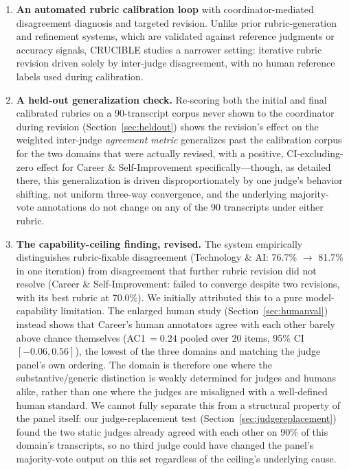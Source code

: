 \documentclass[11pt]{article}
\begin{document}
\begin{enumerate}[leftmargin=*, label=\arabic*.]
\item \textbf{An automated rubric calibration loop} with coordinator-mediated
disagreement diagnosis and targeted revision. Unlike prior rubric-generation and refinement systems, which are validated against
reference judgments or accuracy signals, CRUCIBLE studies a narrower setting: iterative
rubric revision driven solely by inter-judge disagreement, with no human reference labels used during calibration.

\item \textbf{A held-out generalization check.} Re-scoring both the initial
and final calibrated rubrics on a 90-transcript corpus never shown to the
coordinator during revision (Section~\ref{sec:heldout}) shows the revision's
effect on the weighted inter-judge \emph{agreement metric} generalizes past
the calibration corpus for the two domains that were actually revised, with
a positive, CI-excluding-zero effect for Career \& Self-Improvement
specifically---though, as detailed there, this generalization is driven
disproportionately by one judge's behavior shifting, not uniform three-way
convergence, and the underlying majority-vote annotations do not change on
any of the 90 transcripts under either rubric.

\item \textbf{The capability-ceiling finding, revised.} The system
empirically distinguishes rubric-fixable disagreement (Technology \& AI:
76.7\% $\rightarrow$ 81.7\% in one iteration) from disagreement that further
rubric revision did not resolve (Career \& Self-Improvement: failed to
converge despite two revisions, with its best rubric at 70.0\%). We
initially attributed this to a pure model-capability limitation. The
enlarged human study (Section~\ref{sec:humanval}) instead shows that
Career's human annotators agree with each other barely above chance
themselves (AC1\,$=0.24$ pooled over 20 items, 95\% CI $[-0.06, 0.56]$),
the lowest of the three domains and matching the judge panel's own
ordering. The domain is therefore one where the substantive/generic
distinction is weakly determined for judges and humans alike, rather than
one where the judges are misaligned with a well-defined human standard. We
cannot fully separate this from a structural property of the panel itself:
our judge-replacement test (Section~\ref{sec:judgereplacement}) found the
two static judges already agreed with each other on 90\% of this domain's
transcripts, so no third judge could have changed the panel's
majority-vote output on this set regardless of the ceiling's underlying
cause.


\end{enumerate}
\end{document}
